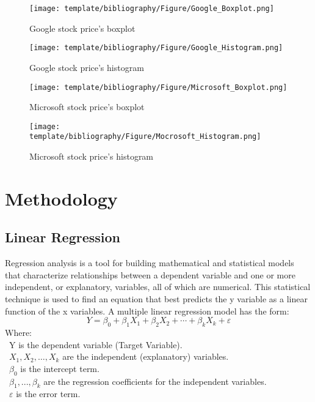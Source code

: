 \documentclass{ieeeojies}
\begin{document}
\begin{figure}[H]
    \centering
    \begin{minipage}{0.23\textwidth}
    \centering
    \texttt{[image: template/bibliography/Figure/Google\_Boxplot.png]}
    \caption{Google stock price's boxplot}
    \label{fig:1}
    \end{minipage}
    \hfill
    \begin{minipage}{0.23\textwidth}
    \centering
    \texttt{[image: template/bibliography/Figure/Google\_Histogram.png]}
    \caption{Google stock price's histogram}
    \label{fig:2}
    \end{minipage}
\end{figure}

\begin{figure}[H]
    \centering
    \begin{minipage}{0.23\textwidth}
    \centering
    \texttt{[image: template/bibliography/Figure/Microsoft\_Boxplot.png]}
    \caption{Microsoft stock price's boxplot}
    \label{fig:1}
    \end{minipage}
    \hfill
    \begin{minipage}{0.23\textwidth}
    \centering
    \texttt{[image: template/bibliography/Figure/Mocrosoft\_Histogram.png]}
    \caption{Microsoft stock price's histogram}
    \label{fig:2}
    \end{minipage}
\end{figure}

\section{Methodology}
\subsection{Linear Regression}
Regression analysis is a tool for building mathematical and statistical models that characterize relationships between a dependent variable and one or more independent, or explanatory, variables, all of which are numerical. This statistical technique is used to find an equation that best predicts the y variable as a linear function of the x variables.
A multiple linear regression model has the form: 
\[Y=\beta_0+\beta_1X_1+\beta_2X_2+\cdots+\beta_kX_k+\varepsilon\]
Where:\\
	\indent\textbullet\ Y is the dependent variable (Target Variable).\\
	\indent\textbullet\ \(X_1, X_2, \ldots, X_k\) are the independent (explanatory) variables.\\
	\indent\textbullet\ \(\beta_0\) is the intercept term.\\
	\indent\textbullet\ \(\beta_1,..., \beta_k\) are the regression coefficients for the independent variables.\\
	\indent\textbullet\ \(\varepsilon\) is the error term.
 
\end{document}
